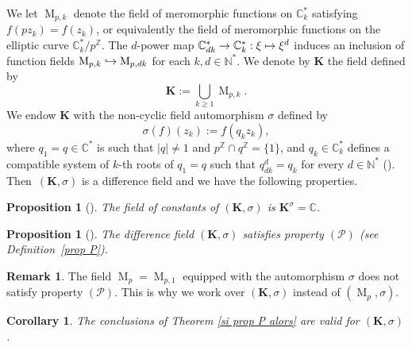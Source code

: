 \documentclass[JEP,XML,SOM,Unicode]{cedram}
\let\mathcal\mathscr
\newcommand\mto{\mathchoice{\longmapsto}{\mapsto}{\mapsto}{\mapsto}}
\newcommand\hto{\mathrel{\lhook\joinrel\to}}
\newtheorem{prop}[theo]{Proposition}
\newtheorem{coro}[theo]{Corollary}
\theoremstyle{definition}
\newtheorem{remark}[theo]{Remark}
\newcommand{\N}{\mathbb N}
\newcommand{\Z}{\mathbb Z}
\newcommand{\C}{\mathbb C}
\newcommand\K{\boldsymbol{K}}
\let\s\sigma
\newcommand{\propP}{(\mathcal{P})}
\newcommand{\mero}{\operatorname{M}}
\begin{document}
We let $\mero_{p,k}$ denote the field of meromorphic functions on $\C^{*}_k$ satisfying $f(pz_k)=f(z_k)$, or equivalently the field of meromorphic functions on the elliptic curve $\C^{*}_k/p^\Z$. The $d$-power map $\C^{*}_{dk}\to \C^{*}_k:\xi\mto \xi^d$ induces an inclusion of function fields $\mero_{p,k}\hto\mero_{p,dk}$ for each $k,d\in\N^{*}$. We denote by $\K$ the field defined by
\[
\K:=
\bigcup_{k \geq 1} \mero_{p,k}.
\]
We endow $\K$ with the non-cyclic field automorphism
$\s$ defined by
\begin{equation}\label{sigma-def}
\s (f)(z_k):=f(q_kz_k),
\end{equation}
where $q_1=q\in \C^{*}$ is such that $\vert q \vert \neq 1$ and $p^{\Z} \cap q^{\Z}=\{1\}$, and $q_k\in\C^{*}_k$ defines a compatible system of $k$-th roots of $q_1=q$ such that $q_{dk}^d=q_k$ for every $d\in\N^{*}$ (\cf \cite[\S 2]{Hen97}).
Then~$(\K,\s)$ is a difference field and we have the following properties.

\begin{prop}[{\cite[Prop.\,5]{dreyfus2015galois}}]
The field of constants of $(\K,\s)$ is
\hbox{$\K^{\s}=\C$}.
\end{prop}

\begin{prop}[{\cite[Prop.\,6]{dreyfus2015galois}}]
The difference field $(\K,\s)$ satisfies property $\propP$ (see Definition~\ref{prop P}).
\end{prop}

\begin{remark}
The field $\mero_{p}=\mero_{p,1}$ equipped with the automorphism $\s$ does not satisfy property $\propP$. This is why we work over $(\K,\s)$ instead of $(\mero_{p},\s)$.
\end{remark}

\begin{coro}\label{coro1}
The conclusions of Theorem \ref{si prop P alors} are valid for $(\K,\s)$.
\end{coro}
\end{document}

